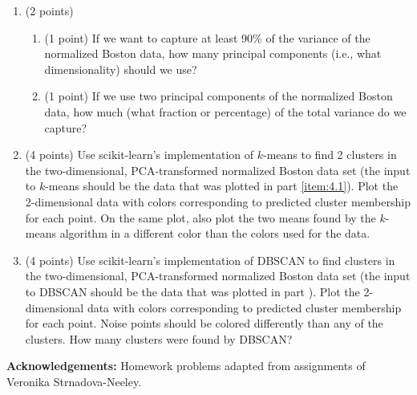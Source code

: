 \documentclass[11pt]{article}
\begin{document}
\begin{enumerate}
\begin{enumerate}
        \item (2 points)
        \begin{enumerate}

            \item (1 point) If we want to capture at least 90\% of the variance
            of the normalized Boston data, how many principal components (i.e.,
            what dimensionality) should we use?

            \item (1 point) If we use two principal components of the normalized
            Boston data, how much (what fraction or percentage) of the total
            variance do we capture?

        \end{enumerate}

        \item (4 points) Use scikit-learn's implementation of $k$-means to find
        2 clusters in the two-dimensional, PCA-transformed normalized Boston
        data set (the input to $k$-means should be the data that was plotted in
        part \ref{item:4.1}). Plot the 2-dimensional data with colors corresponding to
        predicted cluster membership for each point. On the same plot, also plot
        the two means found by the $k$-means algorithm in a different color than
        the colors used for the data.

        \item (4 points) Use scikit-learn's implementation of DBSCAN to find
        clusters in the two-dimensional, PCA-transformed normalized Boston data
        set (the input to DBSCAN should be the data that was plotted in part
        \label{item:4.1}). Plot the 2-dimensional data with colors corresponding
        to predicted cluster membership for each point. Noise points should be
        colored differently than any of the clusters. How many clusters were
        found by DBSCAN?

    \end{enumerate}

\end{enumerate}

{\bf Acknowledgements:} Homework problems adapted from assignments of
Veronika Strnadova-Neeley.
\end{document}
